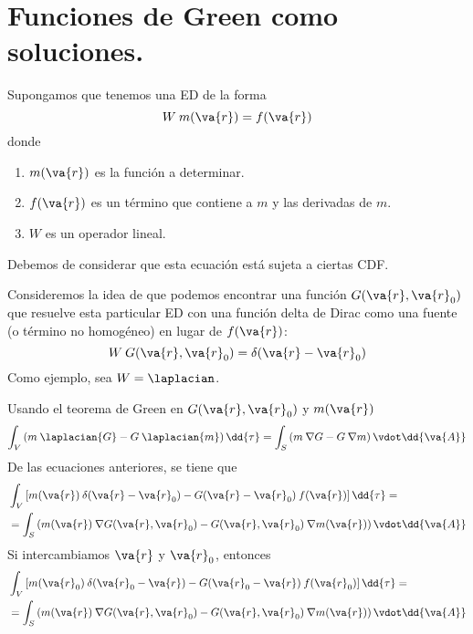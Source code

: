 \section{Funciones de Green como soluciones.}
Supongamos que tenemos una ED de la forma
\begin{equation}
W \: m(\va{r}) =  f(\va{r})
\label{eq:ecuacion_03}
\end{equation}
donde\begin{enumerate}
\item $m(\va{r})$ es la función a determinar.
\item $f(\va{r})$ es un término que contiene a $m$ y las derivadas de $m$.
\item $W$ es un operador lineal.
\end{enumerate}
Debemos de considerar que esta ecuación está sujeta a ciertas CDF.
\par
Consideremos la idea de que podemos encontrar una función $G(\va{r}, \va{r}_{0})$ que resuelve esta particular ED con una función delta de Dirac como una fuente (o término no homogéneo) en lugar de $f(\va{r})$:
\begin{equation}
W \: G(\va{r}, \va{r}_{0}) = \delta (\va{r} - \va{r}_{0})
\label{eq:ecuacion_04}
\end{equation}
Como ejemplo, sea $W = \laplacian$.
\par
Usando el teorema de Green en $G(\va{r}, \va{r}_{0})$ y $m(\va{r})$
\begin{equation}
\int_{V} \left( m \: \laplacian{G} - G \: \laplacian{m} \right) \dd{\tau} = \int_{S} \left( m \: \nabla G - G \: \nabla m \right) \vdot \dd{\va{A}}
\label{eq:ecuacion_05}
\end{equation}
De las ecuaciones anteriores, se tiene que
\begin{align}
&\int_{V} \left[ m(\va{r}) \: \delta(\va{r} - \va{r}_{0}) - G (\va{r} - \va{r}_{0}) \: f(\va{r}) \right] \dd{\tau} = \label{eq:ecuacion_06} \\
&= \int_{S} \left( m(\va{r}) \: \nabla G(\va{r}, \va{r}_{0}) - G(\va{r}, \va{r}_{0}) \: \nabla m(\va{r}) \right) \vdot \dd{\va{A}} \label{eq:ecuacion_07}
\end{align}
Si intercambiamos $\va{r}$ y $\va{r}_{0}$, entonces
\begin{align}
&\int_{V} \left[ m(\va{r}_{0}) \: \delta(\va{r}_{0} - \va{r}) - G (\va{r}_{0} - \va{r}) \: f(\va{r}_{0}) \right] \dd{\tau} = \label{eq:ecuacion_08} \\
&= \int_{S} \left( m(\va{r}) \: \nabla G(\va{r}, \va{r}_{0}) - G(\va{r}, \va{r}_{0}) \: \nabla m(\va{r}) \right) \vdot \dd{\va{A}} \label{eq:ecuacion_09}
\end{align}
